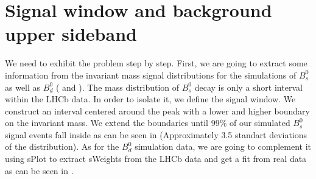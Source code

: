 
\section{Signal window and background upper sideband}

\begin{figure}[H]
    \centering
    \hfill %
    \hfill
    \caption{}
\end{figure}

We need to exhibit the problem step by step. First, we are going to extract some information from the invariant mass signal distributions for the simulations of $B_s^0$ as well as $B_d^0$ ( and ). The mass distribution of $B_s^0$ decay is only a short interval within the LHCb data. In order to isolate it, we define the signal window. We construct an interval centered around the peak with a lower and higher boundary on the invariant mass. We extend the boundaries until 99\% of our simulated $B_s^0$ signal events fall inside as can be seen in  (Approximately 3.5 standart deviations of the distribution). As for the $B_d^0$ simulation data, we are going to complement it using sPlot to extract sWeights from the LHCb data and get a fit from real data as can be seen in .\newline

